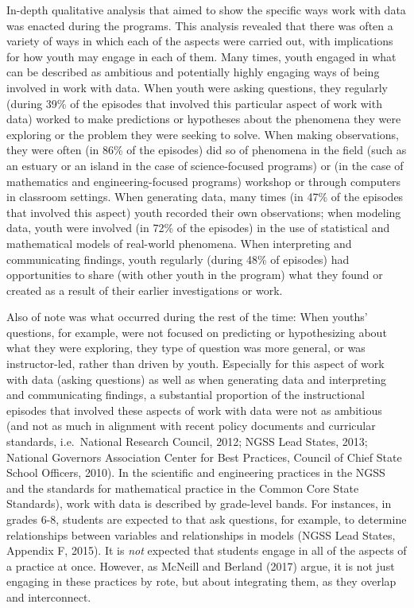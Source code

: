 \documentclass[]{msu-thesis}
\theoremstyle{definition}
\theoremstyle{definition}
\theoremstyle{definition}
\theoremstyle{remark}
\begin{document}
In-depth qualitative analysis that aimed to show the specific ways work
with data was enacted during the programs. This analysis revealed that
there was often a variety of ways in which each of the aspects were
carried out, with implications for how youth may engage in each of them.
Many times, youth engaged in what can be described as ambitious and
potentially highly engaging ways of being involved in work with data.
When youth were asking questions, they regularly (during 39\% of the
episodes that involved this particular aspect of work with data) worked
to make predictions or hypotheses about the phenomena they were
exploring or the problem they were seeking to solve. When making
observations, they were often (in 86\% of the episodes) did so of
phenomena in the field (such as an estuary or an island in the case of
science-focused programs) or (in the case of mathematics and
engineering-focused programs) workshop or through computers in classroom
settings. When generating data, many times (in 47\% of the episodes that
involved this aspect) youth recorded their own observations; when
modeling data, youth were involved (in 72\% of the episodes) in the use
of statistical and mathematical models of real-world phenomena. When
interpreting and communicating findings, youth regularly (during 48\% of
episodes) had opportunities to share (with other youth in the program)
what they found or created as a result of their earlier investigations
or work.

Also of note was what occurred during the rest of the time: When youths'
questions, for example, were not focused on predicting or hypothesizing
about what they were exploring, they type of question was more general,
or was instructor-led, rather than driven by youth. Especially for this
aspect of work with data (asking questions) as well as when generating
data and interpreting and communicating findings, a substantial
proportion of the instructional episodes that involved these aspects of
work with data were not as ambitious (and not as much in alignment with
recent policy documents and curricular standards, i.e.~National Research
Council, 2012; NGSS Lead States, 2013; National Governors Association
Center for Best Practices, Council of Chief State School Officers,
2010). In the scientific and engineering practices in the NGSS and the
standards for mathematical practice in the Common Core State Standards),
work with data is described by grade-level bands. For instances, in
grades 6-8, students are expected to that ask questions, for example, to
determine relationships between variables and relationships in models
(NGSS Lead States, Appendix F, 2015). It is \emph{not} expected that
students engage in all of the aspects of a practice at once. However, as
McNeill and Berland (2017) argue, it is not just engaging in these
practices by rote, but about integrating them, as they overlap and
interconnect.
\end{document}
